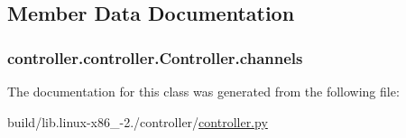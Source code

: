 \subsection{Member Data Documentation}
\hypertarget{classcontroller_1_1controller_1_1Controller_a954001a416c1af88b29758ccede576c1}{}
\subsubsection[{channels}]{\setlength{\rightskip}{0pt plus 5cm}controller.\+controller.\+Controller.\+channels}\label{classcontroller_1_1controller_1_1Controller_a954001a416c1af88b29758ccede576c1}


The documentation for this class was generated from the following file\+:\begin{DoxyCompactItemize}
\item 
build/lib.\+linux-\/x86\+\_-\/2./controller/\hyperlink{build_2lib_8linux-x86__64-2_87_2controller_2controller_8py}{controller.\+py}\end{DoxyCompactItemize}
